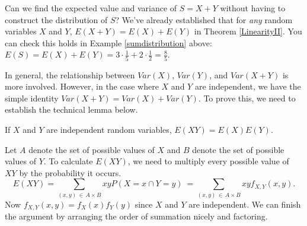 Can we find the expected value and variance of $S = X + Y$ without having to construct the distribution of $S$? We've already established that for \emph{any} random variables $X$ and $Y$, $E(X+Y) = E(X)+E(Y)$ in Theorem \ref{LinearityII}. You can check this holds in Example \ref{sumdistribution} above: $E(S) = E(X) + E(Y) = 3 \cdot \frac{1}{5} + 2 \cdot \frac{1}{2} = \frac{8}{5}$.
\par
In general, the relationship between $Var(X)$, $Var(Y)$, and $Var(X+Y)$ is more involved. However, in the case where $X$ and $Y$ are independent, we have the simple identity $Var(X+Y) = Var(X) + Var(Y)$. To prove this, we need to establish the technical lemma below.

\begin{lem}\label{ExpectationIndependentProduct} If $X$ and $Y$ are independent random variables, $E(XY) = E(X)E(Y)$.
\end{lem}
\begin{pf} Let $A$ denote the set of possible values of $X$ and $B$ denote the set of possible values of $Y$. To calculate $E(XY)$, we need to multiply every possible value of $XY$ by the probability it occurs.
$$E(XY) = \sum_{(x, y) \,\in\, A \times B} xy P(X = x \cap Y= y) \ = \sum_{(x, y) \,\in\, A \times B} xy f_{X,Y}(x,y).$$
\noindent Now $f_{X,Y}(x,y) = f_X(x)f_Y(y)$ since $X$ and $Y$ are independent. We can finish the argument by arranging the order of summation nicely and factoring. 
\end{pf}

